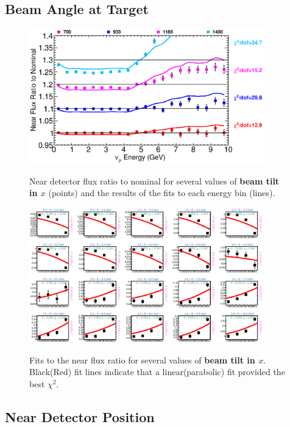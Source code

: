 \clearpage
\subsection{Beam Angle at Target}

\begin{figure}[ht]
  \begin{center}
    {\includegraphics[width=4.0in]{figures/Tilt_t_near_summary.eps}}
  \end{center}
\caption{ Near detector flux ratio to nominal for several values of {\bf beam tilt in $x$} (points) and the results of the fits to each energy bin (lines).}
\end{figure}

\begin{figure}[hb]
  \begin{center}
    {\includegraphics[width=4.0in]{figures/Tilt_t_near_fits.eps}}
  \end{center}
\caption{ Fits to the near flux ratio for several values of {\bf beam tilt in $x$}. Black(Red) fit lines indicate that a linear(parabolic) fit provided the best $\chi^2$. }
\end{figure}

\clearpage
\subsection{Near Detector Position}

